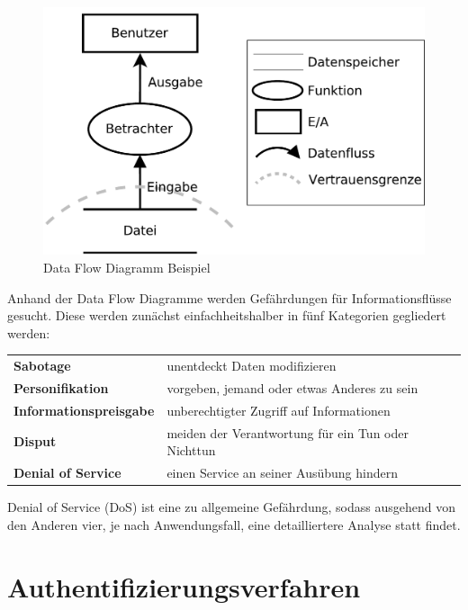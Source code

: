 \documentclass[11pt,a4paper]{report}
\begin{document}
\begin{figure}[htbp]
\centering
\includegraphics[scale=0.4]{images/dfd_intro.pdf}
\caption{Data Flow Diagramm Beispiel}
\label{fig:dfd_intro}
\end{figure}

Anhand der Data Flow Diagramme werden Gefährdungen für Informationsflüsse gesucht. Diese werden zunächst einfachheitshalber in fünf Kategorien gegliedert werden:

\begin{table}[h] %
\begin{tabularx}{\linewidth}{@{}lX@{}}
\textbf{Sabotage} & unentdeckt Daten modifizieren\\
\textbf{Personifikation} & vorgeben, jemand oder etwas Anderes zu sein\\
\textbf{Informationspreisgabe} & unberechtigter Zugriff auf Informationen\\
\textbf{Disput} & meiden der Verantwortung für ein Tun oder Nichttun\\
\textbf{Denial of Service} & einen Service an seiner Ausübung hindern\\
\end{tabularx}
\end{table}

Denial of Service (DoS) ist eine zu allgemeine Gefährdung, sodass ausgehend von den Anderen vier, je nach Anwendungsfall, eine detailliertere Analyse statt findet.

\section{Authentifizierungsverfahren} \label{sec:auth_modells}
\end{document}

